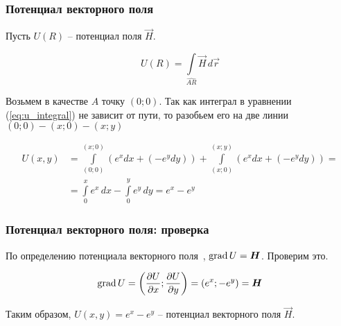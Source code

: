 \begin{frame}\frametitle{Потенциал векторного поля}
	Пусть \(U(R)\) -- потенциал поля \(\vec H\).

	\begin{equation*}
		U(R) =
		\int\limits_{\widehat{AR}} \vec H \, d \vec r
		\label{eq:u_integral}
	\end{equation*}

	Возьмем в качестве $A$ точку $(0; 0)$.
	Так как интеграл в уравнении (\ref{eq:u_integral}) не зависит от пути,
	то разобьем его на две линии $(0; 0) - (x; 0) - (x; y)$

	\begin{align*}
		U(x, y) & = \int\limits_{(0; 0)}^{(x; 0)} \left(e^x dx + (-e^y dy) \right) +
		\int\limits_{(x; 0)}^{(x; y)} \left(e^x dx + (-e^y dy) \right) =      \\
		     & =
		\int\limits_{0}^{x} e^x \, dx - \int\limits_{0}^{y} e^y \, dy =
		e^{x} - e^{y}
	\end{align*}

\end{frame}

\begin{frame}\frametitle{Потенциал векторного поля: проверка}
	По определению потенциала векторного поля~\cite[ст.~269]{zorich}, $\grad U = \vec H$. Проверим это.

	\begin{equation*}
		\grad U =
		\left( \frac{\partial U}{\partial x}; \frac{\partial U}{\partial y} \right) =
		\left( e^x; -e^y \right)
		= \vec H
	\end{equation*}

	Таким образом, \(U(x,y) = e^{x} - e^{y}\) -- потенциал векторного поля \(\vec H\).
\end{frame}
